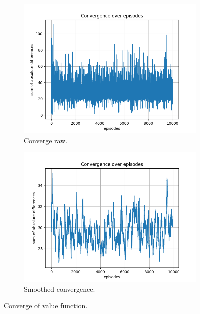 \documentclass{assignment}
\begin{document}
\begin{figure}[H]
    \begin{subfigure}{0.5\textwidth}
        \includegraphics[width=\textwidth]{figures/convergence_q/alpha_sweep/convergence_Q_alpha_0.5_gamma_0.95_epislon_0.2.png}
    \caption{Converge raw.}
    \end{subfigure}\hfill
    \begin{subfigure}{0.5\textwidth}
        \includegraphics[width=\textwidth]{figures/convergence_q/alpha_sweep/convergence_Q_smoothed_alpha_0.5_gamma_0.95_epislon_0.2.png}
    \caption{Smoothed convergence.}
    \end{subfigure}
    \caption{Converge of value function.}
    \label{fig:alpha_0.5_q_learning_convergence}
\end{figure}
\end{document}
